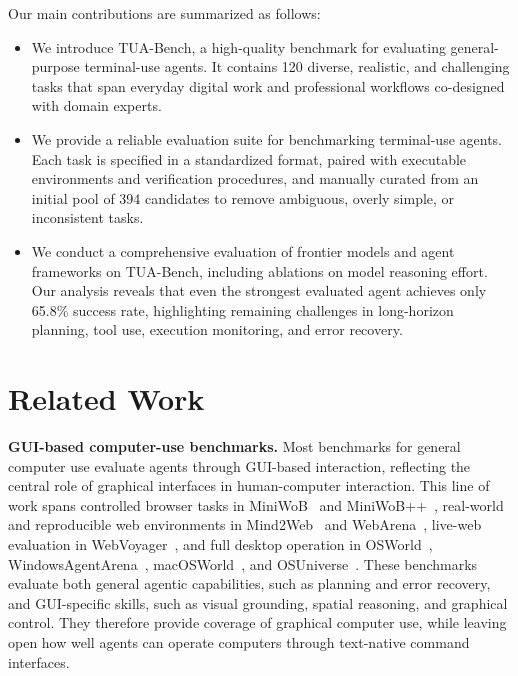 \documentclass{llmxive}
\providecommand{\benchname}{\mbox{TUA-Bench}\xspace}
\begin{document}
Our main contributions are summarized as follows:

\begin{itemize}
    \item We introduce \benchname, a high-quality benchmark for evaluating general-purpose terminal-use agents. It contains 120 diverse, realistic, and challenging tasks that span everyday digital work and professional workflows co-designed with domain experts.

    \item We provide a reliable evaluation suite for benchmarking terminal-use agents. Each task is specified in a standardized format, paired with executable environments and verification procedures, and manually curated from an initial pool of 394 candidates to remove ambiguous, overly simple, or inconsistent tasks.

    \item We conduct a comprehensive evaluation of frontier models and agent frameworks on \benchname, including ablations on model reasoning effort. Our analysis reveals that even the strongest evaluated agent achieves only 65.8\% success rate, highlighting remaining challenges in long-horizon planning, tool use, execution monitoring, and error recovery.
\end{itemize}



\section{Related Work}
\label{sec:related-work}

\noindent\textbf{GUI-based computer-use benchmarks.}
Most benchmarks for general computer use evaluate agents through GUI-based interaction, reflecting the central role of graphical interfaces in human-computer interaction. This line of work spans controlled browser tasks in MiniWoB~\citep{shi2017world} and MiniWoB++~\citep{zheran2018reinforcement}, real-world and reproducible web environments in Mind2Web~\citep{deng2023mind2web} and WebArena~\citep{zhou2024webarena}, live-web evaluation in WebVoyager~\citep{he2024webvoyager}, and full desktop operation in OSWorld~\citep{xie2024osworld}, WindowsAgentArena~\citep{bonatti2025windows}, macOSWorld~\citep{yang2026macosworld}, and OSUniverse~\citep{davydova2025osuniverse}. These benchmarks evaluate both general agentic capabilities, such as planning and error recovery, and GUI-specific skills, such as visual grounding, spatial reasoning, and graphical control. They therefore provide coverage of graphical computer use, while leaving open how well agents can operate computers through text-native command interfaces.
\end{document}
